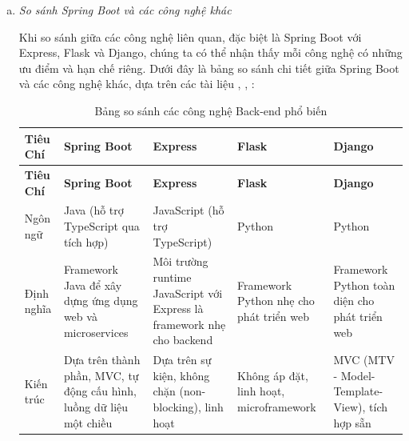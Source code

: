 \begin{enumerate}[(a)]
	\item \textit{So sánh Spring Boot và các công nghệ khác}

	      Khi so sánh giữa các công nghệ liên quan, đặc biệt là Spring Boot với Express, Flask và Django, chúng ta có thể nhận thấy mỗi công nghệ có những ưu điểm và hạn chế riêng. Dưới đây là bảng so sánh chi tiết giữa Spring Boot và các công nghệ khác, dựa trên các tài liệu \cite{BackCompare1}, \cite{BackCompare2}, \cite{BackCompare3}:

	      \begin{landscape}  %
		      \begin{longtable}{|p{3.5cm}|p{5cm}|p{5cm}|p{5cm}|p{5cm}|}
			      \caption{Bảng so sánh các công nghệ Back-end phổ biến}
			      \hline
			      \textbf{Tiêu Chí}    & \textbf{Spring Boot}                                                         & \textbf{Express}                                                         & \textbf{Flask}                                           & \textbf{Django}                                           \\
			      \hline
			      \endfirsthead
			      \hline
			      \textbf{Tiêu Chí}    & \textbf{Spring Boot}                                                         & \textbf{Express}                                                         & \textbf{Flask}                                           & \textbf{Django}                                           \\
			      \hline
			      \endhead
			      \hline
			      Ngôn ngữ             & Java (hỗ trợ TypeScript qua tích hợp)                                        & JavaScript (hỗ trợ TypeScript)                                           & Python                                                   & Python                                                    \\
			      \hline
			      Định nghĩa           & Framework Java để xây dựng ứng dụng web và microservices                     & Môi trường runtime JavaScript với Express là framework nhẹ cho backend   & Framework Python nhẹ cho phát triển web                  & Framework Python toàn diện cho phát triển web             \\
			      \hline
			      Kiến trúc            & Dựa trên thành phần, MVC, tự động cấu hình, luồng dữ liệu một chiều          & Dựa trên sự kiện, không chặn (non-blocking), linh hoạt                   & Không áp đặt, linh hoạt, microframework                  & MVC (MTV - Model-Template-View), tích hợp sẵn             \\

\end{longtable}
\end{landscape}
\end{enumerate}
